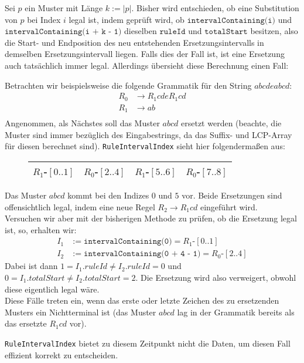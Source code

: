 Sei $p$ ein Muster mit Länge $k := |p|$. Bisher wird entschieden, ob eine Substitution von $p$ bei Index $i$ legal ist, indem geprüft wird, ob $\texttt{intervalContaining(i)}$ und $\texttt{intervalContaining(i + k - 1)}$ dieselben $\texttt{ruleId}$ und $\texttt{totalStart}$ besitzen, also die Start- und Endposition des neu entstehenden Ersetzungsintervalls in demselben Ersetzungsintervall liegen. Falls dies der Fall ist, ist eine Ersetzung auch tatsächlich immer legal. Allerdings übersieht diese Berechnung einen Fall:

Betrachten wir beispielsweise die folgende Grammatik für den String $abcdeabcd$:
\begin{align*}
	R_0 &\rightarrow R_1 c d e R_1 c d\\
	R_1 &\rightarrow a b\\
\end{align*}
Angenommen, als Nächstes soll das Muster $abcd$ ersetzt werden (beachte, die Muster sind immer bezüglich des Eingabestrings, da das Suffix- und LCP-Array für diesen berechnet sind).
\texttt{RuleIntervalIndex} sieht hier folgendermaßen aus:
\begin{figure}[H]
	\centering
	\begin{tabular}{|c|c|c|c|} \hline
		$R_1$-$[0..1]$ & $R_0$-$[2..4]$ & $R_1$-$[5..6]$ & $R_0$-$[7..8]$ \\\hline
	\end{tabular}
\end{figure}

Das Muster $abcd$ kommt bei den Indizes $0$ und $5$ vor. Beide Ersetzungen sind offensichtlich legal, indem eine neue Regel $R_2 \rightarrow R_1cd$ eingeführt wird.\\ 
Versuchen wir aber mit der bisherigen Methode zu prüfen, ob die Ersetzung legal ist, so, erhalten wir:
\begin{align*}
	I_1 &:= \texttt{intervalContaining(0)} = R_1\text{-}[0..1]\\
	I_2 &:= \texttt{intervalContaining(0 + 4 - 1)} = R_0\text{-}[2..4]
\end{align*} 
Dabei ist dann $1 = I_1.ruleId \neq I_2.ruleId = 0$ und $0 = I_1.totalStart \neq I_2.totalStart = 2$. Die Ersetzung wird also verweigert, obwohl diese eigentlich legal wäre.\\
Diese Fälle treten ein, wenn das erste oder letzte Zeichen des zu ersetzenden Musters ein Nichtterminal ist (das Muster $abcd$ lag in der Grammatik bereits als das ersetzte $R_1 cd$ vor).

\texttt{RuleIntervalIndex} bietet zu diesem Zeitpunkt nicht die Daten, um diesen Fall effizient korrekt zu entscheiden.